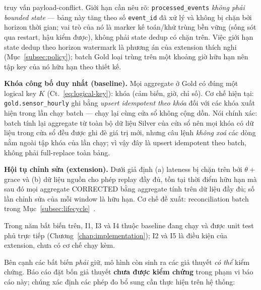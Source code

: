 \begin{description}
        truy vấn payload-conflict. Giới hạn cần nêu rõ:
        \texttt{processed\_events} \emph{không phải bounded state} --- bảng
        này tăng theo số \texttt{event\_id} đã xử lý và không bị chặn bởi
        horizon thời gian; vai trò của nó là marker kế toán/khử trùng bền
        vững (sống sót qua restart, hậu kiểm được), không phải state dedup
        có chặn trên. Việc giới hạn state dedup theo horizon watermark là
        phương án của extension thích nghi (Mục~\ref{subsec:policy}); batch
        Gold loại trùng trên một khoảng giờ hữu hạn nên tập key của nó hữu
        hạn theo thiết kế.
  \item[\textbf{I4.}] \textbf{Khóa công bố duy nhất (baseline).} Mọi aggregate ở
        Gold có đúng một logical key $K$ (Ct.~\ref{eq:logical-key}): khóa
        (cảm biến, giờ, chỉ số). Cơ chế hiện tại:
        \texttt{gold.sensor\_hourly} ghi bằng \emph{upsert idempotent theo
        khóa} đối với các khóa xuất hiện trong lần chạy batch --- chạy lại
        cùng cửa sổ không cộng dồn. Nói chính xác: batch tính lại
        aggregate từ toàn bộ dữ liệu Silver của cửa sổ nên mọi khóa có dữ
        liệu trong cửa sổ đều được ghi đè giá trị mới, nhưng câu lệnh
        \emph{không xoá} các dòng nằm ngoài tập khóa của lần chạy; vì vậy
        đây là upsert idempotent theo batch, không phải full-replace toàn
        bảng.
  \item[\textbf{I5.}] \textbf{Hội tụ chỉnh sửa (extension).} Dưới giả định (a)
        lateness bị chặn trên bởi $\theta + $ grace và (b) dữ liệu nguồn cho
        phép replay đầy đủ, tồn tại thời điểm hữu hạn mà sau đó mọi aggregate
        CORRECTED bằng aggregate tính trên dữ liệu đầy đủ; số lần chỉnh sửa
        của mỗi window là hữu hạn. Cơ chế đề xuất: reconciliation batch
        trong Mục~\ref{subsec:lifecycle}~\cite{dataflow_model_2015}.
\end{description}

Trong năm bất biến trên, I1, I3 và I4 thuộc baseline đang chạy và được unit
test phủ trực tiếp (Chương~\ref{chap:implementation}); I2 và I5 là điều
kiện của extension, chưa có cơ chế chạy kèm.

Bên cạnh các bất biến \emph{phải} giữ, mô hình còn sinh ra các giả thuyết
\emph{có thể} kiểm chứng. Báo cáo đặt bốn giả thuyết
\textbf{chưa được kiểm chứng}
trong phạm vi báo cáo này; chúng xác định các phép đo bổ sung cần thực
hiện trên hệ thống:

